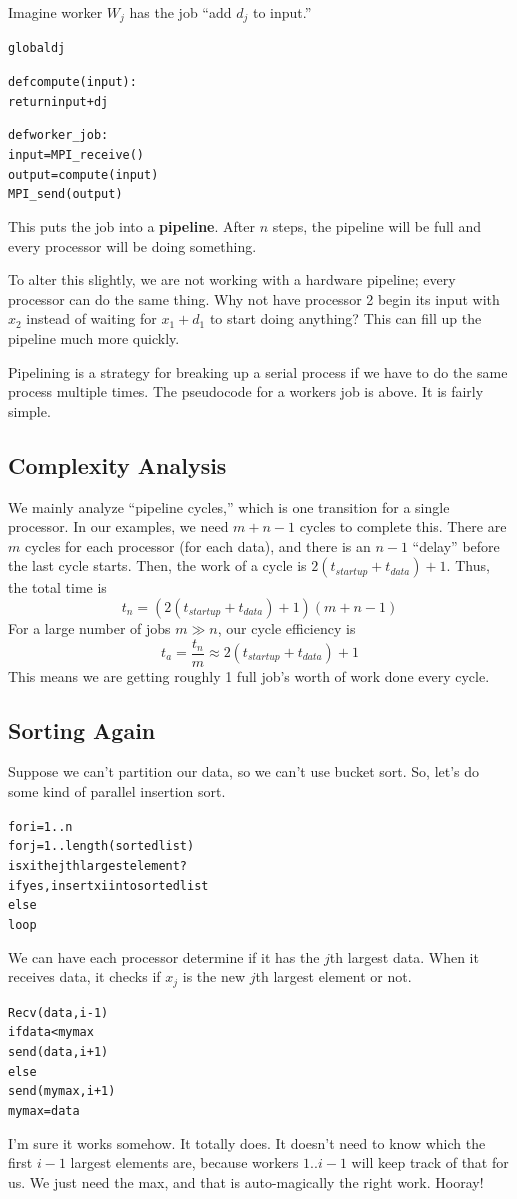 \documentclass[12pt]{article}
\numberwithin{equation}{section}
\theoremstyle{theorem}
\theoremstyle{definition}
\theoremstyle{remark}
\begin{document}
Imagine worker $W_j$ has the job ``add $d_j$ to input.''  
\begin{alltt}
global dj

def compute(input):
  return input + dj
  
def worker\_job:
  input = MPI\_receive()
  output = compute(input)
  MPI\_send(output)
\end{alltt}
This puts the job into a \textbf{pipeline}.  After $n$ steps, the pipeline will be full and every processor will be doing something.

To alter this slightly, we are not working with a hardware pipeline; every processor can do the same thing.  Why not have processor 2 begin its input with $x_2$ instead of waiting for $x_1 + d_1$ to start doing anything?  This can fill up the pipeline much more quickly. 

Pipelining is a strategy for breaking up a serial process if we have to do the same process multiple times.  The pseudocode for a workers job is above.  It is fairly simple.  

\subsection{Complexity Analysis}
We mainly analyze ``pipeline cycles,'' which is one transition for a single processor.  In our examples, we need $m + n - 1$ cycles to complete this.  There are $m$ cycles for each processor (for each data), and there is an $n - 1$ ``delay'' before the last cycle starts.  Then, the work of a cycle is $2(t_{startup} + t_{data}) + 1$.  Thus, the total time is
\begin{equation}
t_n = (2(t_{startup} + t_{data}) + 1)(m + n - 1)
\end{equation}
For a large number of jobs $m \gg n$, our cycle efficiency is
\begin{equation}
t_a = \frac{t_n}{m} \approx 2(t_{startup} + t_{data}) + 1
\end{equation}
This means we are getting roughly 1 full job's worth of work done every cycle.

\subsection{Sorting Again}
Suppose we can't partition our data, so we can't use bucket sort.  So, let's do some kind of parallel insertion sort.
\begin{alltt}
for i = 1..n
  for j = 1..length(sorted list)
    is xi the jth largest element?
      if yes, insert xi into sorted list
    else
      loop
\end{alltt}
We can have each processor determine if it has the $j$th largest data.  When it receives data, it checks if $x_j$ is the new $j$th largest element or not.
\begin{alltt}
Recv(data, i-1)
if data < mymax
  send(data, i+1)
else
  send(mymax, i+1)
  mymax = data
\end{alltt}
I'm sure it works somehow.  It totally does.  It doesn't need to know which the first $i - 1$ largest elements are, because workers $1..i-1$ will keep track of that for us.  We just need the max, and that is auto-magically the right work.  Hooray!
\end{document}
